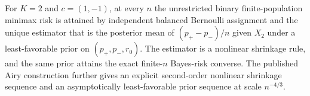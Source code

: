 For \(K=2\) and \(c=(1,-1)\), at every \(n\) the unrestricted binary finite-population minimax risk is attained by independent balanced Bernoulli assignment and the unique estimator that is the posterior mean of \((p_+-p_-)/n\) given \(X_2\) under a least-favorable prior on \((p_+,p_-,r_0)\). The estimator is a nonlinear shrinkage rule, and the same prior attains the exact finite-\(n\) Bayes-risk converse. The published Airy construction further gives an explicit second-order nonlinear shrinkage sequence and an asymptotically least-favorable prior sequence at scale \(n^{-4/3}\).